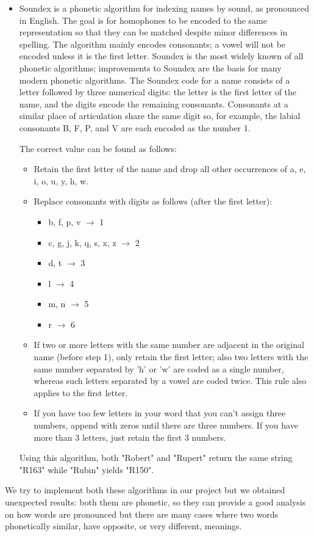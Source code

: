 \documentclass[conference, onecolumn]{IEEEtran}
\begin{document}
\begin{itemize}
	\item Soundex is a phonetic algorithm for indexing names by sound, as pronounced in English. The goal is for homophones to be encoded to the same representation so that they can be matched despite minor differences in spelling. The algorithm mainly encodes consonants; a vowel will not be encoded unless it is the first letter. Soundex is the most widely known of all phonetic algorithms; improvements to Soundex are the basis for many modern phonetic algorithms.
	The Soundex code for a name consists of a letter followed by three numerical digits: the letter is the first letter of the name, and the digits encode the remaining consonants. Consonants at a similar place of articulation share the same digit so, for example, the labial consonants B, F, P, and V are each encoded as the number 1.

	The correct value can be found as follows:
	\begin{itemize}
		\item Retain the first letter of the name and drop all other occurrences of a, e, i, o, u, y, h, w.
		\item Replace consonants with digits as follows (after the first letter):
		\begin{itemize}
			\item b, f, p, v $\to$ 1
			\item c, g, j, k, q, s, x, z $\to$ 2
			\item d, t $\to$ 3
			\item l $\to$ 4
			\item m, n $\to$ 5
			\item r $\to$ 6
		\end{itemize}
		\item If two or more letters with the same number are adjacent in the original name (before step 1), only retain the first letter; also two letters with the same number separated by 'h' or 'w' are coded as a single number, whereas such letters separated by a vowel are coded twice. This rule also applies to the first letter.
		\item If you have too few letters in your word that you can't assign three numbers, append with zeros until there are three numbers. If you have more than 3 letters, just retain the first 3 numbers.
	\end{itemize}
Using this algorithm, both "Robert" and "Rupert" return the same string "R163" while "Rubin" yields "R150".
\end{itemize}
We try to implement both these algorithms in our project but we obtained unexpected results: both them are phonetic, so they can provide a good analysis on how words are pronounced but there are many cases where two words phonetically similar, have opposite, or very different, meanings.
\end{document}
